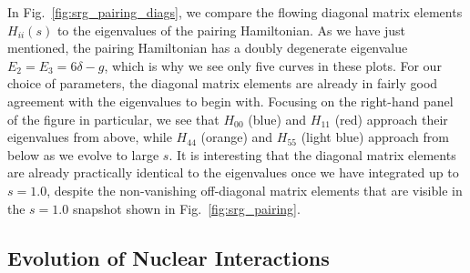 In Fig.~\ref{fig:srg_pairing_diags}, we compare the flowing diagonal matrix
elements $H_{ii}(s)$ to the eigenvalues of the pairing Hamiltonian. As
we have just mentioned, the pairing Hamiltonian has a doubly degenerate 
eigenvalue $E_2=E_3=6\delta-g$, which is why we see only five curves
in these plots. For our choice of parameters, the diagonal matrix elements
are already in fairly good agreement with the eigenvalues to begin with. Focusing
on the right-hand panel of the figure in particular, we see that $H_{00}$ (blue) 
and $H_{11}$ (red) approach their eigenvalues from above, while 
$H_{44}$ (orange) and $H_{55}$ (light blue) approach from below as we evolve
to large $s$. It is interesting that the diagonal matrix elements 
are already practically identical to the eigenvalues once we have 
integrated up to $s=1.0$, despite the non-vanishing off-diagonal matrix elements 
that are visible in the $s=1.0$ snapshot shown in Fig.~\ref{fig:srg_pairing}.

\subsection{Evolution of Nuclear Interactions}






